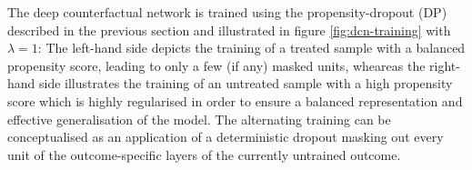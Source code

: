 The deep counterfactual network is trained using the propensity-dropout (DP) described in the previous section and illustrated in figure \ref{fig:dcn-training} with $\lambda = 1$: The left-hand side depicts the training of a treated sample with a balanced propensity score, leading to only a few (if any) masked units, wheareas the right-hand side illustrates the training of an untreated sample with a high propensity score which is highly regularised in order to ensure a balanced representation and effective generalisation of the model. The alternating training can be conceptualised as an application of a deterministic dropout masking out every unit of the outcome-specific layers of the currently untrained outcome.



